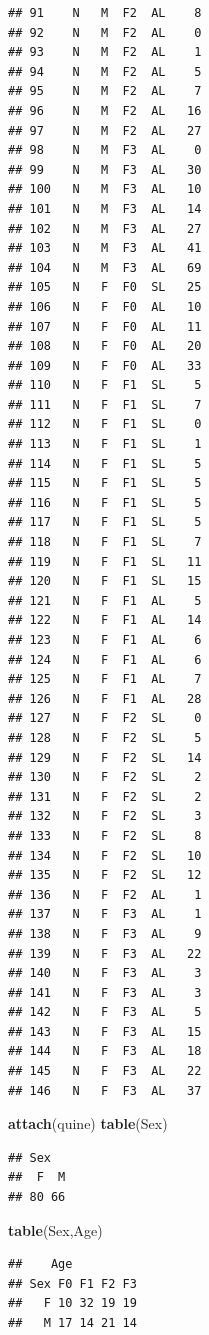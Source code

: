 \documentclass[]{article}
\newenvironment{Shaded}{\begin{snugshade}}{\end{snugshade}}
\newcommand{\KeywordTok}[1]{\textcolor[rgb]{0.13,0.29,0.53}{\textbf{{#1}}}}
\newcommand{\NormalTok}[1]{{#1}}
\numberwithin{equation}{section}
\begin{document}
\begin{verbatim}
## 91    N   M  F2  AL    8
## 92    N   M  F2  AL    0
## 93    N   M  F2  AL    1
## 94    N   M  F2  AL    5
## 95    N   M  F2  AL    7
## 96    N   M  F2  AL   16
## 97    N   M  F2  AL   27
## 98    N   M  F3  AL    0
## 99    N   M  F3  AL   30
## 100   N   M  F3  AL   10
## 101   N   M  F3  AL   14
## 102   N   M  F3  AL   27
## 103   N   M  F3  AL   41
## 104   N   M  F3  AL   69
## 105   N   F  F0  SL   25
## 106   N   F  F0  AL   10
## 107   N   F  F0  AL   11
## 108   N   F  F0  AL   20
## 109   N   F  F0  AL   33
## 110   N   F  F1  SL    5
## 111   N   F  F1  SL    7
## 112   N   F  F1  SL    0
## 113   N   F  F1  SL    1
## 114   N   F  F1  SL    5
## 115   N   F  F1  SL    5
## 116   N   F  F1  SL    5
## 117   N   F  F1  SL    5
## 118   N   F  F1  SL    7
## 119   N   F  F1  SL   11
## 120   N   F  F1  SL   15
## 121   N   F  F1  AL    5
## 122   N   F  F1  AL   14
## 123   N   F  F1  AL    6
## 124   N   F  F1  AL    6
## 125   N   F  F1  AL    7
## 126   N   F  F1  AL   28
## 127   N   F  F2  SL    0
## 128   N   F  F2  SL    5
## 129   N   F  F2  SL   14
## 130   N   F  F2  SL    2
## 131   N   F  F2  SL    2
## 132   N   F  F2  SL    3
## 133   N   F  F2  SL    8
## 134   N   F  F2  SL   10
## 135   N   F  F2  SL   12
## 136   N   F  F2  AL    1
## 137   N   F  F3  AL    1
## 138   N   F  F3  AL    9
## 139   N   F  F3  AL   22
## 140   N   F  F3  AL    3
## 141   N   F  F3  AL    3
## 142   N   F  F3  AL    5
## 143   N   F  F3  AL   15
## 144   N   F  F3  AL   18
## 145   N   F  F3  AL   22
## 146   N   F  F3  AL   37
\end{verbatim}

\begin{Shaded}
\begin{Highlighting}[]
\KeywordTok{attach}\NormalTok{(quine)}
\KeywordTok{table}\NormalTok{(Sex)}
\end{Highlighting}
\end{Shaded}

\begin{verbatim}
## Sex
##  F  M 
## 80 66
\end{verbatim}

\begin{Shaded}
\begin{Highlighting}[]
\KeywordTok{table}\NormalTok{(Sex,Age)}
\end{Highlighting}
\end{Shaded}

\begin{verbatim}
##    Age
## Sex F0 F1 F2 F3
##   F 10 32 19 19
##   M 17 14 21 14
\end{verbatim}
\end{document}
